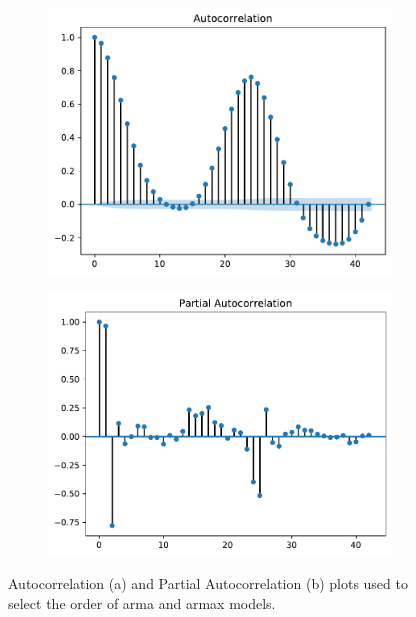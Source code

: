 \begin{figure}[h!]%
	\centering
	\begin{subfigure}{.5\textwidth}
		\centering
		\includegraphics[width=\textwidth]{plots/ACF/load_42lags_ndiff0_hstep1}%
		\caption{}
		\label{fig:acf_load_lags42}%
	\end{subfigure}%
	\begin{subfigure}{.5\textwidth}
		\centering
		\includegraphics[width=\textwidth]{plots/PACF/load_42lags_ndiff0_hstep1}%
		\caption{}
		\label{fig:pacf_load_lags42}%
	\end{subfigure}
	\caption{Autocorrelation (a) and Partial Autocorrelation (b) plots used to select the order of \gls{arma} and \gls{armax} models.}
	\label{fig:acf_compare}
\end{figure}


